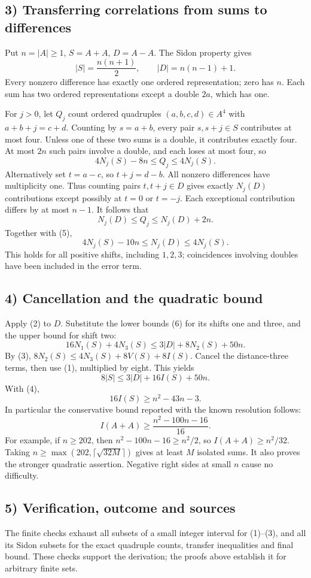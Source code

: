 \subsection*{3) Transferring correlations from sums to differences}
Put $n=|A|\ge1$, $S=A+A$, $D=A-A$. The Sidon property gives
\[
 |S|=\frac{n(n+1)}2,\qquad |D|=n(n-1)+1.\tag{4}
\]
Every nonzero difference has exactly one ordered representation; zero has $n$. Each sum has two ordered representations except a double $2a$, which has one.

For $j>0$, let $Q_j$ count ordered quadruples $(a,b,c,d)\in A^4$ with $a+b+j=c+d$. Counting by $s=a+b$, every pair $s,s+j\in S$ contributes at most four. Unless one of these two sums is a double, it contributes exactly four. At most $2n$ such pairs involve a double, and each loses at most four, so
\[
 4N_j(S)-8n\le Q_j\le4N_j(S).\tag{5}
\]
Alternatively set $t=a-c$, so $t+j=d-b$. All nonzero differences have multiplicity one. Thus counting pairs $t,t+j\in D$ gives exactly $N_j(D)$ contributions except possibly at $t=0$ or $t=-j$. Each exceptional contribution differs by at most $n-1$. It follows that
\[
 N_j(D)\le Q_j\le N_j(D)+2n.
\]
Together with (5),
\[
 4N_j(S)-10n\le N_j(D)\le4N_j(S).\tag{6}
\]
This holds for all positive shifts, including $1,2,3$; coincidences involving doubles have been included in the error term.

\subsection*{4) Cancellation and the quadratic bound}
Apply (2) to $D$. Substitute the lower bounds (6) for its shifts one and three, and the upper bound for shift two:
\[
 16N_1(S)+4N_3(S)\le3|D|+8N_2(S)+50n.
\]
By (3), $8N_2(S)\le4N_3(S)+8V(S)+8I(S)$. Cancel the distance-three terms, then use (1), multiplied by eight. This yields
\[
 8|S|\le3|D|+16I(S)+50n.
\]
With (4),
\[
 16I(S)\ge n^2-43n-3.
\]
In particular the conservative bound reported with the known resolution follows:
\[
 \boxed{\ I(A+A)\ge\frac{n^2-100n-16}{16}.\ }\tag{7}
\]
For example, if $n\ge202$, then $n^2-100n-16\ge n^2/2$, so $I(A+A)\ge n^2/32$. Taking $n\ge\max(202,\lceil\sqrt{32M}\rceil)$ gives at least $M$ isolated sums. It also proves the stronger quadratic assertion. Negative right sides at small $n$ cause no difficulty.

\subsection*{5) Verification, outcome and sources}
The finite checks exhaust all subsets of a small integer interval for (1)--(3), and all its Sidon subsets for the exact quadruple counts, transfer inequalities and final bound. These checks support the derivation; the proofs above establish it for arbitrary finite sets.


